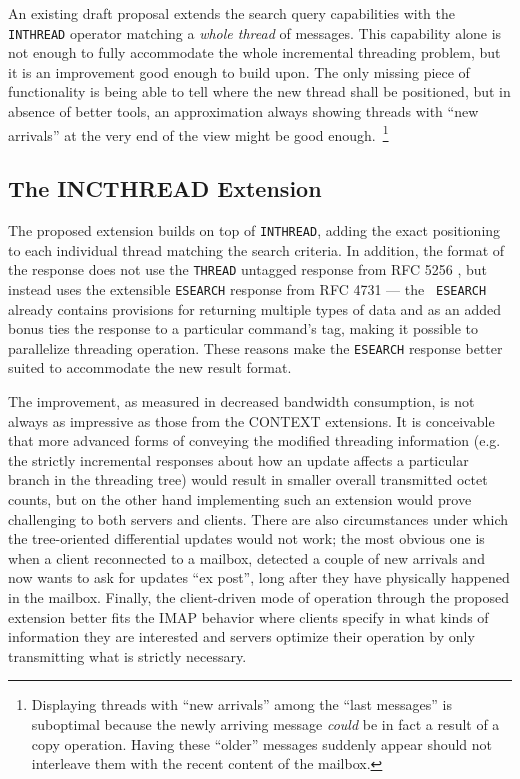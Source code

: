 \documentclass[trojita]{subfiles}
\begin{document}
An existing draft proposal \cite{draft-ietf-morg-inthread} extends the search query capabilities with the {\tt INTHREAD}
operator matching a {\em whole thread} of messages.  This capability alone is not enough to fully accommodate the whole
incremental threading problem, but it is an improvement good enough to build upon.  The only missing piece of
functionality is being able to tell where the new thread shall be positioned, but in absence of better tools, an
approximation always showing threads with ``new arrivals'' at the very end of the view might be good
enough.~\footnote{Displaying threads with ``new arrivals'' among the ``last messages'' is suboptimal because the newly
arriving message {\em could} be in fact a result of a copy operation.  Having these ``older'' messages suddenly appear
should not interleave them with the recent content of the mailbox.}

\subsection{The INCTHREAD Extension}

The proposed extension builds on top of {\tt INTHREAD}, adding the exact positioning to each individual thread matching
the search criteria.  In addition, the format of the response does not use the {\tt THREAD} untagged response from RFC
5256 \cite{rfc5256}, but instead uses the extensible {\tt ESEARCH} response from RFC 4731 \cite{rfc4731} --- the {\tt
ESEARCH} already contains provisions for returning multiple types of data and as an added bonus ties the response to a
particular command's tag, making it possible to parallelize threading operation.  These reasons make the {\tt ESEARCH}
response better suited to accommodate the new result format.

The improvement, as measured in decreased bandwidth consumption, is not always as impressive as those from the CONTEXT
extensions.  It is conceivable that more advanced forms of conveying the modified threading information (e.g. the
strictly incremental responses about how an update affects a particular branch in the threading tree) would result in
smaller overall transmitted octet counts, but on the other hand implementing such an extension would prove challenging
to both servers and clients.  There are also circumstances under which the tree-oriented differential updates would not
work; the most obvious one is when a client reconnected to a mailbox, detected a couple of new arrivals and now wants to
ask for updates ``ex post'', long after they have physically happened in the mailbox.  Finally, the client-driven mode
of operation through the proposed extension better fits the IMAP behavior where clients specify in what kinds of
information they are interested and servers optimize their operation by only transmitting what is strictly necessary.
\end{document}

